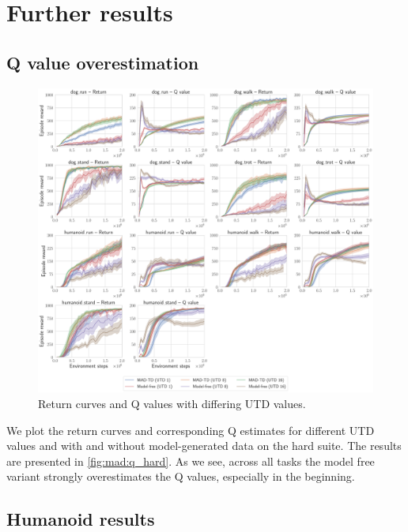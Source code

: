 \section{Further results}
\label{app:results}

\subsection{Q value overestimation}
\label{app:results_q}
\begin{figure}[ht]
    \centering
    \includegraphics[width=\linewidth]{figures/mad-td/q_values_utd.pdf}
    \caption{Return curves and Q values with differing UTD values.}
    \label{fig:mad:q_hard}
\end{figure}


We plot the return curves and corresponding Q estimates for different UTD values and with and without model-generated data on the hard suite.
The results are presented in \autoref{fig:mad:q_hard}.
As we see, across all tasks the model free variant strongly overestimates the Q values, especially in the beginning.


\subsection{Humanoid results}
\label{app:results_hum}


